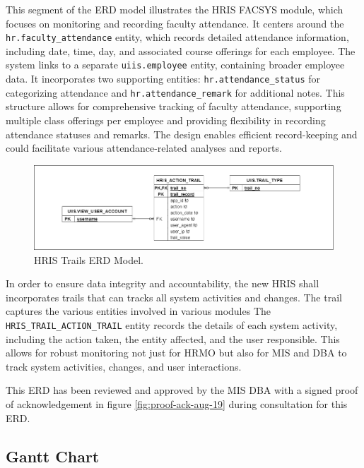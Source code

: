     This segment of the ERD model illustrates the HRIS FACSYS module, which focuses on monitoring and recording faculty attendance. It centers around the \texttt{hr.faculty\_attendance} entity, which records detailed attendance information, including date, time, day, and associated course offerings for each employee. The system links to a separate \texttt{uiis.employee} entity, containing broader employee data. It incorporates two supporting entities: \texttt{hr.attendance\_status} for categorizing attendance and \texttt{hr.attendance\_remark} for additional notes. This structure allows for comprehensive tracking of faculty attendance, supporting multiple class offerings per employee and providing flexibility in recording attendance statuses and remarks. The design enables efficient record-keeping and could facilitate various attendance-related analyses and reports.

    \begin{figure}[H]
        \centering
        \includegraphics[width=1\linewidth]{figures/images/diagrams/erd/erd-trails.png}
        \caption{HRIS Trails ERD Model.}
        \label{fig:erd-trails}
    \end{figure}

    In order to ensure data integrity and accountability, the new HRIS shall incorporates trails that can tracks all system activities and changes. The trail captures the various entities involved in various modules The \texttt{HRIS\_TRAIL\_ACTION\_TRAIL} entity records the details of each system activity, including the action taken, the entity affected, and the user responsible. This allows for robust monitoring not just for HRMO but also for MIS and DBA to track system activities, changes, and user interactions. 

    This ERD has been reviewed and approved by the MIS DBA with a signed proof of acknowledgement in figure \ref{fig:proof-ack-aug-19} during consultation for this ERD. 
    
    \subsection{Gantt Chart}
    
